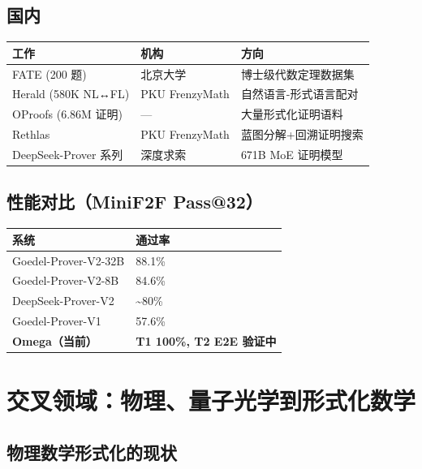 \documentclass[
  11pt,
  a4paper,
]{ctexrep}
\newcounter{none} %
\begin{document}
\subsection{国内}\label{ux56fdux5185}

{\def\LTcaptype{none} %
\begin{longtable}[]{@{}lll@{}}
\toprule\noalign{}
工作 & 机构 & 方向 \\
\midrule\noalign{}
\endhead
\bottomrule\noalign{}
\endlastfoot
FATE (200 题) & 北京大学 & 博士级代数定理数据集 \\
Herald (580K NL↔FL) & PKU FrenzyMath & 自然语言-形式语言配对 \\
OProofs (6.86M 证明) & --- & 大量形式化证明语料 \\
Rethlas & PKU FrenzyMath & 蓝图分解+回溯证明搜索 \\
DeepSeek-Prover 系列 & 深度求索 & 671B MoE 证明模型 \\
\end{longtable}
}

\subsection{性能对比（MiniF2F
Pass@32）}\label{ux6027ux80fdux5bf9ux6bd4minif2f-pass32}

{\def\LTcaptype{none} %
\begin{longtable}[]{@{}ll@{}}
\toprule\noalign{}
系统 & 通过率 \\
\midrule\noalign{}
\endhead
\bottomrule\noalign{}
\endlastfoot
Goedel-Prover-V2-32B & 88.1\% \\
Goedel-Prover-V2-8B & 84.6\% \\
DeepSeek-Prover-V2 & \textasciitilde80\% \\
Goedel-Prover-V1 & 57.6\% \\
\textbf{Omega（当前）} & \textbf{T1 100\%, T2 E2E 验证中} \\
\end{longtable}
}

\section{交叉领域：物理、量子光学到形式化数学}\label{sec-cross-domain}

\subsection{物理数学形式化的现状}\label{ux7269ux7406ux6570ux5b66ux5f62ux5f0fux5316ux7684ux73b0ux72b6}
\end{document}
